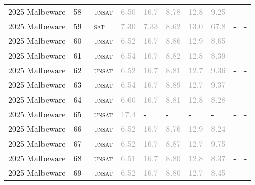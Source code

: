 \begin{center}
{\begin{longtable}{@{}llllllllll@{}}
2025 Malbeware & 58 & ~\textsc{unsat} & \textcolor{darkgray}{6.50} & \textcolor{darkgray}{16.7} & \textcolor{darkgray}{8.78} & \textcolor{darkgray}{12.8} & \textcolor{darkgray}{9.25} & - & - \\
2025 Malbeware & 59 & ~\textsc{sat} & \textcolor{darkgray}{7.30} & \textcolor{darkgray}{7.33} & \textcolor{darkgray}{8.62} & \textcolor{darkgray}{13.0} & \textcolor{darkgray}{67.8} & - & - \\
2025 Malbeware & 60 & ~\textsc{unsat} & \textcolor{darkgray}{6.52} & \textcolor{darkgray}{16.7} & \textcolor{darkgray}{8.86} & \textcolor{darkgray}{12.9} & \textcolor{darkgray}{8.65} & - & - \\
2025 Malbeware & 61 & ~\textsc{unsat} & \textcolor{darkgray}{6.54} & \textcolor{darkgray}{16.7} & \textcolor{darkgray}{8.82} & \textcolor{darkgray}{12.8} & \textcolor{darkgray}{8.39} & - & - \\
2025 Malbeware & 62 & ~\textsc{unsat} & \textcolor{darkgray}{6.52} & \textcolor{darkgray}{16.7} & \textcolor{darkgray}{8.81} & \textcolor{darkgray}{12.7} & \textcolor{darkgray}{9.36} & - & - \\
2025 Malbeware & 63 & ~\textsc{unsat} & \textcolor{darkgray}{6.54} & \textcolor{darkgray}{16.7} & \textcolor{darkgray}{8.89} & \textcolor{darkgray}{12.7} & \textcolor{darkgray}{9.37} & - & - \\
2025 Malbeware & 64 & ~\textsc{unsat} & \textcolor{darkgray}{6.60} & \textcolor{darkgray}{16.7} & \textcolor{darkgray}{8.81} & \textcolor{darkgray}{12.8} & \textcolor{darkgray}{8.28} & - & - \\
2025 Malbeware & 65 & ~\textsc{unsat} & \textcolor{darkgray}{17.4} & - & - & - & - & - & - \\
2025 Malbeware & 66 & ~\textsc{unsat} & \textcolor{darkgray}{6.52} & \textcolor{darkgray}{16.7} & \textcolor{darkgray}{8.76} & \textcolor{darkgray}{12.9} & \textcolor{darkgray}{8.24} & - & - \\
2025 Malbeware & 67 & ~\textsc{unsat} & \textcolor{darkgray}{6.52} & \textcolor{darkgray}{16.7} & \textcolor{darkgray}{8.87} & \textcolor{darkgray}{12.7} & \textcolor{darkgray}{9.75} & - & - \\
2025 Malbeware & 68 & ~\textsc{unsat} & \textcolor{darkgray}{6.51} & \textcolor{darkgray}{16.7} & \textcolor{darkgray}{8.80} & \textcolor{darkgray}{12.8} & \textcolor{darkgray}{8.37} & - & - \\
2025 Malbeware & 69 & ~\textsc{unsat} & \textcolor{darkgray}{6.52} & \textcolor{darkgray}{16.7} & \textcolor{darkgray}{8.80} & \textcolor{darkgray}{12.7} & \textcolor{darkgray}{8.45} & - & - \\

\end{longtable}}
\end{center}
